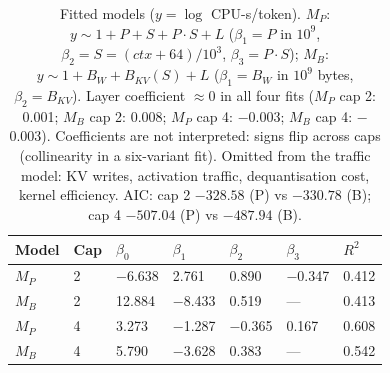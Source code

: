 \documentclass[10pt,letterpaper,twocolumn]{article}
\begin{document}
\begin{table}[ht]
\centering\footnotesize\setlength{\tabcolsep}{4pt}
\begin{tabular}{@{}lllllll@{}}
\toprule
Model & Cap & $\beta_0$ & $\beta_1$ & $\beta_2$ & $\beta_3$ & $R^2$ \\
\midrule
$M_P$ & 2 & $-$6.638 & 2.761 & 0.890 & $-$0.347 & 0.412 \\
$M_B$ & 2 & 12.884 & $-$8.433 & 0.519 & --- & 0.413 \\
$M_P$ & 4 & 3.273 & $-$1.287 & $-$0.365 & 0.167 & 0.608 \\
$M_B$ & 4 & 5.790 & $-$3.628 & 0.383 & --- & 0.542 \\
\bottomrule
\end{tabular}
\caption{Fitted models ($y=\log$ CPU-s/token). $M_P$: $y\sim1+P+S+
P\cdot S+L$ ($\beta_1=P$ in $10^9$, $\beta_2=S=(ctx+64)/10^3$,
$\beta_3=P\cdot S$); $M_B$: $y\sim1+B_W+B_{KV}(S)+L$ ($\beta_1=B_W$
in $10^9$ bytes, $\beta_2=B_{KV}$). Layer coefficient $\approx$0
in all four fits ($M_P$ cap 2: 0.001; $M_B$ cap 2: 0.008; $M_P$ cap 4:
$-$0.003; $M_B$ cap 4: $-$0.003). Coefficients are not
interpreted: signs flip across caps (collinearity in a
six-variant fit). Omitted from the traffic model: KV writes,
activation traffic, dequantisation cost, kernel efficiency.
AIC: cap 2 $-328.58$ (P) vs $-330.78$ (B); cap 4 $-507.04$ (P)
vs $-487.94$ (B).}
\end{table}
\end{document}
